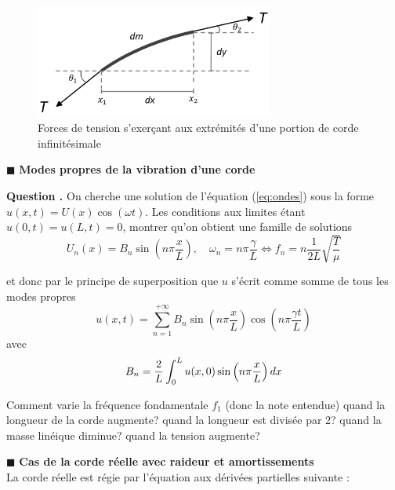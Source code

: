 \documentclass[a4,12pt]{article}
\newcounter{Nbquestion}
\newcommand*\question{%
\stepcounter{Nbquestion}%
\textbf{Question \theNbquestion. }}
\begin{document}
\begin{figure}[b]
	\begin{center}
		\includegraphics[width=0.7\textwidth]{images/tension.pdf}
		\caption{Forces de tension s'exerçant aux extrémités d'une portion de corde infinitésimale}
		\label{fig:tension}
	\end{center}
\end{figure}

\indent $\blacksquare$ \textbf{Modes propres de la vibration d'une corde}\\


\begin{mdframed}[style=exampledefault]
\question On cherche une solution de l'équation (\ref{eq:ondes}) sous la forme $u(x,t)=U(x)\cos(\omega t)$. Les conditions aux limites étant $u(0,t)=u(L,t)=0$, montrer qu'on obtient une famille de solutions 
\[
U_n(x)=B_n\sin\left(n\pi \frac{x}{L}\right),\quad \omega_n=n\pi \frac{\gamma}{L}\Leftrightarrow f_n=n\frac{1}{2L}\sqrt{\frac{T}{\mu}}
\]

et donc par le principe de superposition que $u$ s'écrit comme somme de tous les modes propres 
\[
u(x,t)=\sum_{n=1}^{+\infty}B_n\sin\left(n\pi \frac{x}{L}\right) \cos\left(n\pi \frac{\gamma t}{L}\right)
\]
avec 
\[ 
B_n = {2 \over L} \int_{0}^{L} u(x,0) \sin \left(n \pi {x \over L}\right) dx
\]

Comment varie la fréquence fondamentale $f_1$ (donc la note entendue) quand la longueur de la corde augmente? quand la longueur est divisée par 2? quand la masse linéique diminue? quand la tension augmente?
\end{mdframed}


\indent $\blacksquare$ \textbf{Cas de la corde réelle avec raideur et amortissements}\\

La corde réelle est régie par l'équation aux dérivées partielles suivante :
\end{document}
